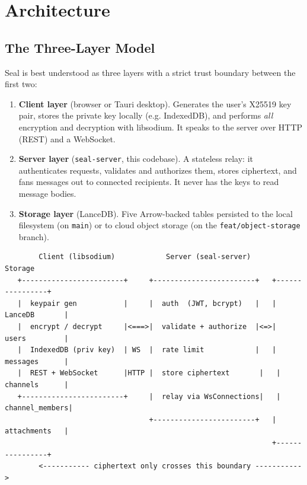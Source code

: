 \chapter{Architecture}
\label{chap:architecture}

\section{The Three-Layer Model}

Seal is best understood as three layers with a strict trust boundary between the
first two:

\begin{enumerate}
  \item \textbf{Client layer} (browser or Tauri desktop). Generates the user's
        X25519 key pair, stores the private key locally (e.g. IndexedDB), and
        performs \emph{all} encryption and decryption with libsodium. It speaks
        to the server over HTTP (REST) and a WebSocket.
  \item \textbf{Server layer} (\verb|seal-server|, this codebase). A stateless
        relay: it authenticates requests, validates and authorizes them, stores
        ciphertext, and fans messages out to connected recipients. It never has
        the keys to read message bodies.
  \item \textbf{Storage layer} (LanceDB). Five Arrow-backed tables persisted to
        the local filesystem (on \verb|main|) or to cloud object storage (on the
        \verb|feat/object-storage| branch).
\end{enumerate}

\begin{lstlisting}
        Client (libsodium)            Server (seal-server)          Storage
   +------------------------+     +------------------------+   +----------------+
   |  keypair gen           |     |  auth  (JWT, bcrypt)   |   |  LanceDB       |
   |  encrypt / decrypt     |<===>|  validate + authorize  |<=>|  users         |
   |  IndexedDB (priv key)  | WS  |  rate limit            |   |  messages      |
   |  REST + WebSocket      |HTTP |  store ciphertext       |   |  channels      |
   +------------------------+     |  relay via WsConnections|   |  channel_members|
                                  +------------------------+   |  attachments   |
                                                               +----------------+
        <----------- ciphertext only crosses this boundary ----------->
\end{lstlisting}

